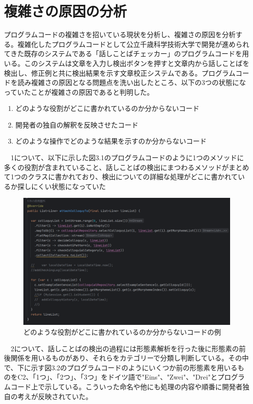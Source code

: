 \documentclass[11pt, a4paper]{jreport}
\begin{document}
\section{複雑さの原因の分析}
プログラムコードの複雑さを招いている現状を分析し、複雑さの原因を分析する。複雑化したプログラムコードとして公立千歳科学技術大学で開発が進められてきた既存のシステムである「話しことばチェッカー」のプログラムコードを用いる。このシステムは文章を入力し検出ボタンを押すと文章内から話しことばを検出し、修正例と共に検出結果を示す文章校正システムである。プログラムコードを読み複雑さの原因となる問題点を洗い出したところ、以下の3つの状態になっていたことが複雑さの原因であると判明した。
\begin{enumerate}
\item どのような役割がどこに書かれているのか分からないコード
\item 開発者の独自の解釈を反映させたコード
\item どのような操作でどのような結果を示すのか分からないコード
\end{enumerate}
　1について、以下に示した図3.1のプログラムコードのように1つのメソッドに多くの役割が含まれていること、話しことばの検出にまつわるメソッドがまとめて1つのクラスに書かれており、検出についての詳細な処理がどこに書かれているか探しにくい状態になっていた
\begin{figure}[H]
\centering \includegraphics[width=1\linewidth]{image/genin1.png}
\caption{どのような役割がどこに書かれているのか分からないコードの例}
\label{fig:enter-label}
\end{figure}
　2について、話しことばの検出の過程には形態素解析を行った後に形態素の前後関係を用いるものがあり、それらをカテゴリーで分類し判断している。その中で、下に示す図3.2のプログラムコードのようにいくつか前の形態素を用いるものをC2、「1つ」、「2つ」、「3つ」をドイツ語で"Eins"、"Zwei"、"Drei"とプログラムコード上で示している。こういった命名や他にも処理の内容や順番に開発者独自の考えが反映されていた。
\end{document}
